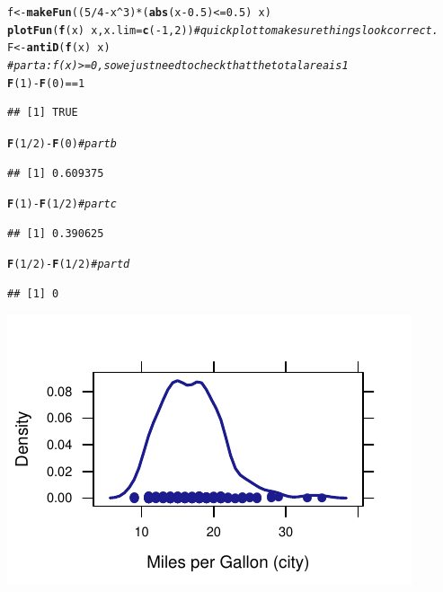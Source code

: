 \documentclass[twoside]{book}\usepackage[]{graphicx}\usepackage[]{xcolor}
\makeatletter
\def\maxwidth{ %
  \ifdim\Gin@nat@width>\linewidth
    \linewidth
  \else
    \Gin@nat@width
  \fi
}
\newcommand{\hlnum}[1]{\textcolor[rgb]{0.686,0.059,0.569}{#1}}%
\newcommand{\hlcom}[1]{\textcolor[rgb]{0.678,0.584,0.686}{\textit{#1}}}%
\newcommand{\hlopt}[1]{\textcolor[rgb]{0,0,0}{#1}}%
\newcommand{\hlstd}[1]{\textcolor[rgb]{0.345,0.345,0.345}{#1}}%
\newcommand{\hlkwb}[1]{\textcolor[rgb]{0.69,0.353,0.396}{#1}}%
\newcommand{\hlkwc}[1]{\textcolor[rgb]{0.333,0.667,0.333}{#1}}%
\newcommand{\hlkwd}[1]{\textcolor[rgb]{0.737,0.353,0.396}{\textbf{#1}}}%
\newenvironment{kframe}{%
 \def\at@end@of@kframe{}%
 \ifinner\ifhmode%
  \def\at@end@of@kframe{\end{minipage}}%
  \begin{minipage}{\columnwidth}%
 \fi\fi%
 \def\FrameCommand##1{\hskip\@totalleftmargin \hskip-\fboxsep
 \colorbox{shadecolor}{##1}\hskip-\fboxsep
     \hskip-\linewidth \hskip-\@totalleftmargin \hskip\columnwidth}%
 \MakeFramed {\advance\hsize-\width
   \@totalleftmargin\z@ \linewidth\hsize
   \@setminipage}}%
 {\par\unskip\endMakeFramed%
 \at@end@of@kframe}
\newenvironment{knitrout}{}{} %
\makeatother
\begin{document}
\begin{solution}
\begin{knitrout}
\color{fgcolor}\begin{kframe}
\begin{alltt}
\hlstd{f} \hlkwb{<-} \hlkwd{makeFun}\hlstd{((}\hlnum{5}\hlopt{/}\hlnum{4} \hlopt{-} \hlstd{x}\hlopt{^}\hlnum{3}\hlstd{)} \hlopt{*} \hlstd{(}\hlkwd{abs}\hlstd{(x} \hlopt{-} \hlnum{0.5}\hlstd{)} \hlopt{<=} \hlnum{0.5}\hlstd{)} \hlopt{~} \hlstd{x)}
\hlkwd{plotFun}\hlstd{(}\hlkwd{f}\hlstd{(x)} \hlopt{~} \hlstd{x,} \hlkwc{x.lim} \hlstd{=} \hlkwd{c}\hlstd{(}\hlopt{-}\hlnum{1}\hlstd{,} \hlnum{2}\hlstd{))}  \hlcom{# quick plot to make sure things look correct.}
\hlstd{F} \hlkwb{<-} \hlkwd{antiD}\hlstd{(}\hlkwd{f}\hlstd{(x)} \hlopt{~} \hlstd{x)}
\hlcom{# part a: f(x) >=0, so we just need to check that the total area is 1}
\hlkwd{F}\hlstd{(}\hlnum{1}\hlstd{)} \hlopt{-} \hlkwd{F}\hlstd{(}\hlnum{0}\hlstd{)} \hlopt{==} \hlnum{1}
\end{alltt}
\begin{verbatim}
## [1] TRUE
\end{verbatim}
\begin{alltt}
\hlkwd{F}\hlstd{(}\hlnum{1}\hlopt{/}\hlnum{2}\hlstd{)} \hlopt{-} \hlkwd{F}\hlstd{(}\hlnum{0}\hlstd{)}  \hlcom{# part b}
\end{alltt}
\begin{verbatim}
## [1] 0.609375
\end{verbatim}
\begin{alltt}
\hlkwd{F}\hlstd{(}\hlnum{1}\hlstd{)} \hlopt{-} \hlkwd{F}\hlstd{(}\hlnum{1}\hlopt{/}\hlnum{2}\hlstd{)}  \hlcom{# part c}
\end{alltt}
\begin{verbatim}
## [1] 0.390625
\end{verbatim}
\begin{alltt}
\hlkwd{F}\hlstd{(}\hlnum{1}\hlopt{/}\hlnum{2}\hlstd{)} \hlopt{-} \hlkwd{F}\hlstd{(}\hlnum{1}\hlopt{/}\hlnum{2}\hlstd{)}  \hlcom{# part d}
\end{alltt}
\begin{verbatim}
## [1] 0
\end{verbatim}
\end{kframe}

{\centering \includegraphics[width=\maxwidth]{figures/fig-unnamed-chunk-26-1} 

}
\end{knitrout}
\end{solution}
\end{document}
